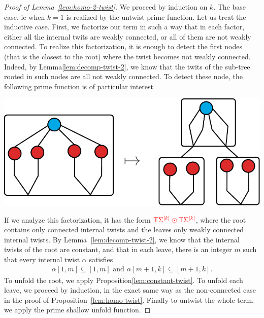 \begin{proof}[Proof of Lemma~\ref{lem:homo-2-twist}]
We proceed by induction on $k$. The base case, ie when $k=1$ is realized by the untwist prime function. Let us treat the inductive case. First, we factorize our term in such a way that in each factor, either all the internal twits are weakly connected, or all of them are not weakly connected. To realize this factorization, it is enough to detect the first nodes (that is the closest to the root) where the twist becomes not weakly connected. Indeed, by Lemma\ref{lem:decomp-twist-2}, we know that the twits of the sub-tree rooted in such nodes are all not weakly connected. To detect these node, the following prime function is of particular interest
\begin{center}
\includegraphics[scale=.4]{pictures/last-prime-function}
\end{center}
If we analyze this factorization, it has the form ${\color{red}{{\color{red}{\mathsf T}}\Sigma^{{\color{red}{[k]}}} \odot {\color{red}{\mathsf T}}\Sigma^{{\color{red}{[k]}}}}}$, where the root contains only connected internal twists and the leaves only weakly connected internal twists. By Lemma~\ref{lem:decomp-twist-2}, we know that the internal twists of the root  are constant, and that in each leave, there is an integer $m$ such that every internal twist $\alpha$ satisfies
\begin{align*}
\alpha[1,m] \subseteq [1,m]  \text{ and } 
\alpha[m+1,k]\subseteq [m+1,k].
\end{align*}
To unfold the root, we apply Proposition\ref{lem:constant-twist}. To unfold each leave, we proceed by induction, in the exact same way as the non-connected case in the proof of Proposition~\ref{lem:homo-twist}. Finally to untwist the whole term, we apply the prime shallow unfold function. 
\end{proof}
